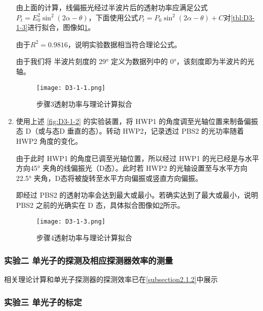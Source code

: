 \documentclass[dvipsnames, svgnames,a4paper,11pt]{article}
\begin{document}
\begin{enumerate}
			由上面的计算，线偏振光经过半波片后的透射功率应满足公式 $P_t = E_0^2 \sin^2(2 \alpha - \theta)$，下面使用公式$ P_t = P_0 \sin^2(2\alpha - \theta) + C $对\cref{tbl:D3-1-3}进行拟合，图像如\cref{fig:D3-1-1}。

			由于$R^2 = 0.9816$，说明实验数据相当符合理论公式。

			由于我们将 半波片刻度的 29° 定义为数据列中的 0°，该刻度即为半波片的光轴。

			\begin{figure}[H]
				\centering
				\texttt{[image: D3-1-1.png]}
				\caption{步骤3透射功率与理论计算拟合}
				\label{fig:D3-1-1}
			\end{figure}



			\item 使用上述 \cref{fig:D3-1-2} 的实验装置，将 HWP1 的角度调至光轴位置来制备偏振态 D（或与态D 垂直的态）。转动 HWP2，记录透过 PBS2 的光功率随着 HWP2 角度的变化。 

			由于此时 HWP1 的角度已调至光轴位置，所以经过 HWP1 的光已经是与水平方向45° 夹角的线偏振光（D态）。此时若 HWP2 的光轴设置至与水平方向 22.5° 夹角，D态将被旋转至水平方向偏振或竖直方向偏振。
			
			即经过 PBS2 的透射功率会达到最大或最小。若确实达到了最大或最小，说明 PBS2 之前的光确实在 D 态，具体拟合图像如\cref{fig:D3-1-3}所示。

			\begin{figure}[H]
				\centering
				\texttt{[image: D3-1-3.png]}
				\caption{步骤4透射功率与理论计算拟合}
				\label{fig:D3-1-3}
			\end{figure}
			
		\end{enumerate}

			
















	\subsubsection{实验二 \quad 单光子的探测及相应探测器效率的测量}

		相关理论计算和单光子探测器的探测效率已在\cref{subsection2.1.2}中展示


	\subsubsection{实验三 \quad 单光子的标定}
\end{document}
